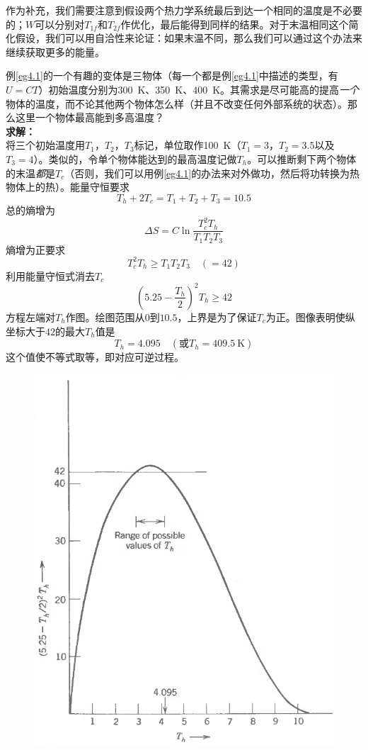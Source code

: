 作为补充，我们需要注意到假设两个热力学系统最后到达一个相同的温度是不必要的；$W$可以分别对$T_{1f}$和$T_{2f}$作优化，最后能得到同样的结果。对于末温相同这个简化假设，我们可以用自洽性来论证：如果末温不同，那么我们可以通过这个办法来继续获取更多的能量。

\begin{example}
例\ref{eg4.1}的一个有趣的变体是三物体（每一个都是例\ref{eg4.1}中描述的类型，有$U=CT$）初始温度分别为\SI{300}{\kelvin}、\SI{350}{\kelvin}、\SI{400}{\kelvin}。其需求是尽可能高的提高{\it 一个}物体的温度，而不论其他两个物体怎么样（并且不改变任何外部系统的状态）。那么这里一个物体最高能到多高温度？\\
{\bf 求解：}\\
将三个初始温度用$T_1$，$T_2$，$T_3$标记，单位取作\SI{100}{\kelvin}（$T_1=3$，$T_2=3.5$以及$T_3=4$）。类似的，令单个物体能达到的最高温度记做$T_h$。可以推断剩下两个物体的末温{\it 都}是$T_c$（否则，我们可以用例\ref{eg4.1}的办法来对外做功，然后将功转换为热物体上的热）。能量守恒要求
\[
T_h + 2T_c = T_1 + T_2 + T_3 = 10.5
\]
总的熵增为
\[
\Delta S = C\ln\frac{T_c^2T_h}{T_1T_2T_3}
\]
熵增为正要求
\[
T_c^2T_h \ge T_1T_2T_3 \quad (=42)
\]
利用能量守恒式消去$T_c$
\[
(5.25-\frac{T_h}{2})^2T_h\ge 42
\]
方程左端对$T_h$作图。绘图范围从$0$到$10.5$，上界是为了保证$T_c$为正。图像表明使纵坐标大于$42$的最大$T_h$值是
\[
T_h = 4.095 \quad(\text{或}T_h = \SI{409.5}{\kelvin})
\]
这个值使不等式取等，即对应可逆过程。
\end{example}
\begin{figure}
\centering
\includegraphics[width=\textwidth]{Pictures/fig4.1.png}
\end{figure}

